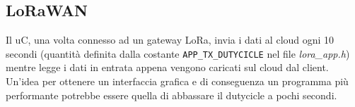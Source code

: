 \subsection{LoRaWAN}\label{ssec:lorawan}
Il uC, una volta connesso ad un gateway LoRa, invia i dati al cloud ogni 10 secondi (quantità definita dalla costante \Verb|APP_TX_DUTYCICLE| nel file \textit{lora\_app.h}) mentre legge i dati in entrata appena vengono caricati sul cloud dal client.
\\Un'idea per ottenere un interfaccia grafica e di conseguenza un programma più performante potrebbe essere quella di abbassare il dutycicle a pochi secondi.


